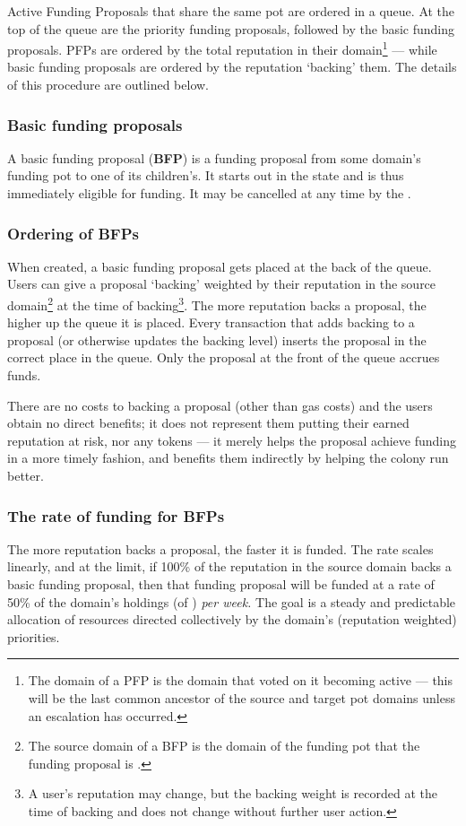 Active Funding Proposals that share the same  pot are ordered in a queue. At the top of the queue are the priority funding proposals, followed by the basic funding proposals. PFPs are ordered by the total reputation in their domain\footnote{The domain of a PFP is the domain that voted on it becoming active --- this will be the last common ancestor of the source and target pot domains unless an escalation has occurred.} --- while basic funding proposals are ordered by the reputation `backing' them.  The details of this procedure are outlined below.

\subsubsection{Basic funding proposals}\label{subsubsec:BFPs}
A basic funding proposal (\textbf{BFP}) is a funding proposal from some domain's funding pot to one of its children's. It starts out in the  state and is thus immediately eligible for funding. It may be cancelled at any time by the .

\subsubsection*{Ordering of BFPs}

When created, a basic funding proposal gets placed at the back of the queue. Users can give a proposal `backing' weighted by their reputation in the source domain\footnote{The source domain of a BFP is the domain of the funding pot that the funding proposal is .} at the time of backing\footnote{A user's reputation may change, but the backing weight is recorded at the time of backing and does not change without further user action.}. The more reputation backs a proposal, the higher up the queue it is placed. Every transaction that adds backing to a proposal (or otherwise updates the backing level) inserts the proposal in the correct place in the queue. Only the proposal at the front of the queue accrues funds.

There are no costs to backing a proposal (other than gas costs) and the users obtain no direct benefits; it does not represent them putting their earned reputation at risk, nor any tokens --- it merely helps the proposal achieve funding in a more timely fashion, and benefits them indirectly by helping the colony run better.

\subsubsection*{The rate of funding for BFPs}
The more reputation backs a proposal, the faster it is funded. The rate scales linearly, and at the limit, if 100\% of the reputation in the source domain backs a basic funding proposal, then that funding proposal will be funded at a rate of 50\% of the domain's holdings (of ) \textit{per week.} The goal is a steady and predictable allocation of resources directed collectively by the domain's (reputation weighted) priorities.

